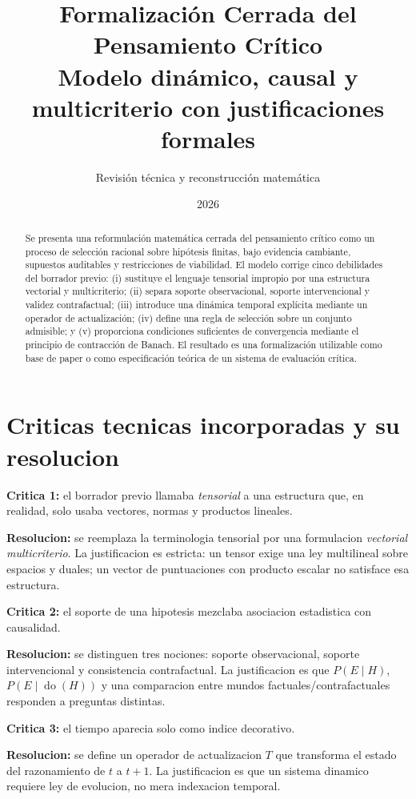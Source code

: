 \documentclass[12pt,a4paper]{article}
\title{\textbf{Formalizaci\'on Cerrada del Pensamiento Cr\'itico}\\
\large Modelo din\'amico, causal y multicriterio con justificaciones formales}
\author{Revisi\'on t\'ecnica y reconstrucci\'on matem\'atica}
\date{2026}
\newcommand{\doop}{\operatorname{do}}
\theoremstyle{definition}
\theoremstyle{plain}
\theoremstyle{remark}
\begin{document}
\maketitle

\begin{abstract}
Se presenta una reformulaci\'on matem\'atica cerrada del pensamiento cr\'itico como un proceso de selecci\'on racional sobre hip\'otesis finitas, bajo evidencia cambiante, supuestos auditables y restricciones de viabilidad. El modelo corrige cinco debilidades del borrador previo: (i) sustituye el lenguaje tensorial impropio por una estructura vectorial y multicriterio; (ii) separa soporte observacional, soporte intervencional y validez contrafactual; (iii) introduce una din\'amica temporal expl\'icita mediante un operador de actualizaci\'on; (iv) define una regla de selecci\'on sobre un conjunto admisible; y (v) proporciona condiciones suficientes de convergencia mediante el principio de contracci\'on de Banach. El resultado es una formalizaci\'on utilizable como base de paper o como especificaci\'on te\'orica de un sistema de evaluaci\'on cr\'itica.
\end{abstract}

\section{Criticas tecnicas incorporadas y su resolucion}

\textbf{Critica 1:} el borrador previo llamaba \emph{tensorial} a una estructura que, en realidad, solo usaba vectores, normas y productos lineales.

\textbf{Resolucion:} se reemplaza la terminologia tensorial por una formulacion \emph{vectorial multicriterio}. La justificacion es estricta: un tensor exige una ley multilineal sobre espacios y duales; un vector de puntuaciones con producto escalar no satisface esa estructura.

\textbf{Critica 2:} el soporte de una hipotesis mezclaba asociacion estadistica con causalidad.

\textbf{Resolucion:} se distinguen tres nociones: soporte observacional, soporte intervencional y consistencia contrafactual. La justificacion es que $P(E\mid H)$, $P(E\mid \doop(H))$ y una comparacion entre mundos factuales/contrafactuales responden a preguntas distintas.

\textbf{Critica 3:} el tiempo aparecia solo como indice decorativo.

\textbf{Resolucion:} se define un operador de actualizacion $T$ que transforma el estado del razonamiento de $t$ a $t+1$. La justificacion es que un sistema dinamico requiere ley de evolucion, no mera indexacion temporal.
\end{document}
